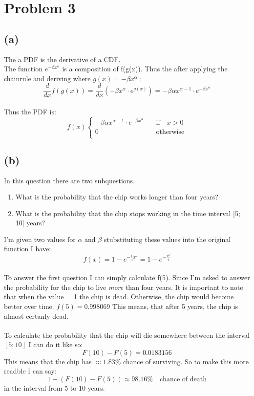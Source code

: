 \section{Problem 3}
\subsection{(a)}
The a PDF is the derivative of a CDF.
\\
The function $e^{- \beta x^{\alpha}}$ is a composition of f(g(x)). 
Thus the after applying the chainrule and deriving where $g(x) = - \beta x^{\alpha} $ :
$$\frac{d}{dx} f(g(x)) = \frac{d}{dx} (- \beta x^{\alpha} \cdot e^{{g(x)}}) = - \beta \alpha x^{\alpha-1} \cdot e^{- \beta x^{\alpha}} $$
\\
Thus the PDF is:
\[f(x) \begin{cases}
    - \beta \alpha x^{\alpha-1} \cdot e^{- \beta x^{\alpha}} & \quad \text{if} \quad x > 0 \\
    0 & \quad \text{otherwise} \\
 \end{cases}
\]

\subsection{(b)}
In this question there are two subquestions.
\begin{enumerate}
    \item What is the probability that the chip works longer than four years?
    \item What is the probability that the chip stops working in the time interval [5;
    10] years?
\end{enumerate}
I'm given two values for $\alpha$ and $\beta$ stubstituting these values into the original
function I have:
$$ f(x) = 1 - e^{-\frac{1}{4}x^2} = 1 - e^{-\frac{x^2}{4}} $$
\\
To answer the first question I can simply calculate f(5). Since I'm asked to answer the probability
for the chip to live \emph{more} than four years. It is important to note that when the value = 1 the
chip is dead. Otherwise, the chip would become better over time.
$f(5) = 0.998069 $ This means, that after 5 years, the chip is almost certanly dead.
\\
\\
To calculate the probability that the chip will die somewhere between the interval $[5;10]$
I can do it like so:
$$F(10)-F(5) = 0.0183156$$ This means that the chip has $\approx 1.83\%$ chance of surviving. So to make this 
more readble I can say:
\\
$$1 - (F(10)-F(5)) \approx 98.16\% \quad \text{chance of death}$$ in the interval from 5 to 10 years.
